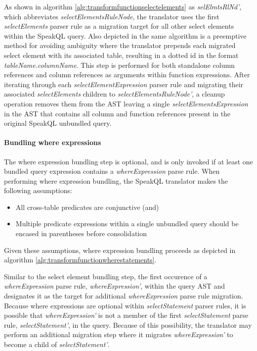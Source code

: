 \TransformFunctionSelectElements

As shown in algorithm \ref{alg:transformfunctionselectelements} as \emph{selElmtsRlNd'}, which abbreviates \emph{selectElementsRuleNode}, the translator uses the first \emph{selectElements} parser rule as a migration target for all other select elements within the SpeakQL query. Also depicted in the same algorithm is a preemptive method for avoiding ambiguity where the translator prepends each migrated select element with its associated table, resulting in a dotted id in the format \emph{tableName.columnName}. This step is performed for both standalone column references and column references as arguments within function expressions. After iterating through each \emph{selectElementExpression} parser rule and migrating their associated \emph{selectElements} children to \emph{selectElementsRuleNode'}, a cleanup operation removes them from the AST leaving a single \emph{selectElementsExpression} in the AST that contains all column and function references present in the original SpeakQL unbundled query.

\paragraph{Bundling where expressions}

The where expression bundling step is optional, and is only invoked if at least one bundled query expression contains a \emph{whereExpression} parse rule. When performing where expression bundling, the SpeakQL translator makes the following assumptions:

\begin{itemize}
\item All cross-table predicates are conjunctive (and)
\item Multiple predicate expressions within a single unbundled query should be encased in parentheses before consolidation
\end{itemize}

Given these assumptions, where expression bundling proceeds as depicted in algorithm \ref{alg:transformfunctionwherestatements}.

\TransformFunctionWhereStatements

Similar to the select element bundling step, the first occurence of a \emph{whereExpression} parse rule, \emph{whereExpression'}, within the query AST and designates it as the target for additional \emph{whereExpression} parse rule migration. Because where expressions are optional within \emph{selectStatement} parser rules, it is possible that \emph{whereExpression'} is not a member of the first \emph{selectStatement} parse rule, \emph{selectStatement'}, in the query. Because of this possibility, the translator may perform an additional migration step where it migrates \emph{whereExpression'} to become a child of \emph{selectStatement'}.

